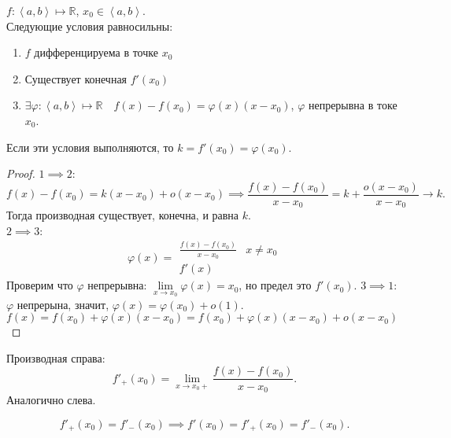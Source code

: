 \documentclass[11pt, oneside]{article}   	%
\begin{document}
        \begin{theorem}
            $f: \left<a, b\right> \mapsto \mathbb{R}$, $x_0\in \left<a, b\right>$.\\
            Следующие условия равносильны:
            \begin{enumerate}
                \item $f$ дифференцируема в точке $x_0$
                \item Существует конечная $f'(x_0)$
                \item $\exists{\varphi: \left<a, b\right> \mapsto \mathbb{R}}\quad f(x)-f(x_0)=\varphi(x)(x-x_0)$, $\varphi$ непрерывна в токе $x_0$.
            \end{enumerate}
            Если эти условия выполняются, то $k=f'(x_0) = \varphi(x_0)$.
            \begin{proof}
            $1 \implies 2$:\\
              \[ f(x)-f(x_0) = k(x-x_0) + o(x-x_0) \implies \frac{f(x)-f(x_0)}{x-x_0} = k + \frac{o(x-x_0)}{x-x_0}\to k .\]
              Тогда производная существует, конечна, и равна $k$.\\
              $2 \implies 3$:\\
              \begin{equation*}
                  \varphi(x) = \begin{split}
                      \frac{f(x)-f(x_0)}{x-x_0} & x \neq x_0\\
                      f'(x)
                  \end{split}
              \end{equation*}
              Проверим что $\varphi$ непрерывна: $\lim\limits_{x \to x_0} \varphi(x) = x_0$, но предел это $f'(x_0)$.
              $3 \implies 1$:\\
              $\varphi$ непрерына, значит, $\varphi(x) = \varphi(x_0) + o(1)$.\\
              $f(x) = f(x_0) + \varphi(x)(x-x_0) = f(x_0) + \varphi(x)(x-x_0) + o(x-x_0)$
          \end{proof}
      \end{theorem}
      \begin{definition}
          Производная справа:
          \[ f'_+(x_0) = \lim\limits_{x \to x_0+} \frac{f(x)-f(x_0)}{x-x_0} .\]
          Аналогично слева.
      \end{definition}
      \begin{dlemma}
          \[ f'_+(x_0) = f'_{-}(x_0) \implies f'(x_0) = f'_{+}(x_0) = f'_{-}(x_0) .\] 
      \end{dlemma}
\end{document}
